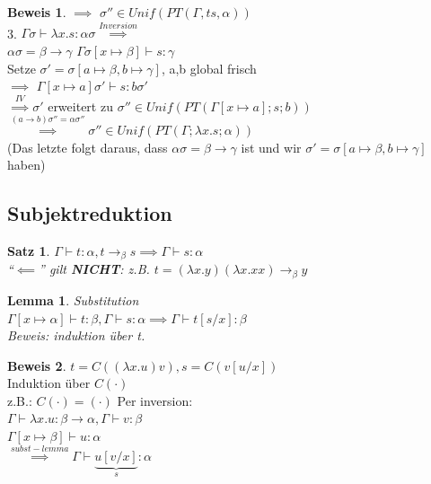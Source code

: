 \documentclass{article}
\newtheorem{satz}{Satz}
\newtheorem{lemma}{Lemma}[section]
\theoremstyle{definition}
\newtheorem{beweis}{Beweis}[section]
\begin{document}
\begin{beweis}
	$\implies$ $\sigma''\in Unif(PT(\Gamma,ts,\alpha))$\\
	3. $\Gamma\sigma\vdash\lambda x.s:\alpha\sigma\stackrel{Inversion}{\implies}$\\
	$\alpha\sigma = \beta\to\gamma$ $\Gamma\sigma[x\mapsto \beta]\vdash s:\gamma$\\
	Setze $\sigma' =\sigma[a\mapsto \beta,b\mapsto \gamma]$, a,b global frisch\\
	$\implies$ $\Gamma[x\mapsto a]\sigma'\vdash s:b\sigma'$\\
	$\stackrel{IV}{\implies}\sigma'$ erweitert zu $\sigma''\in Unif(PT(\Gamma[x\mapsto a];s; b))$\\
	$\stackrel{(a\to b)\sigma'' = \alpha\sigma''}{\implies} \sigma'' \in Unif(PT(\Gamma; \lambda x.s;\alpha))$\\
	(Das letzte folgt daraus, dass $\alpha\sigma= \beta\to \gamma$ ist und wir $\sigma' =\sigma[a\mapsto \beta,b\mapsto \gamma]$ haben)
	\end{beweis}
	\subsection{Subjektreduktion}
	\begin{satz} $\Gamma\vdash t:\alpha, t\to_\beta s\implies \Gamma \vdash s:\alpha$\\
	\danger{} ``$\impliedby$'' gilt \textbf{NICHT}: z.B. $t=(\lambda x.y)(\lambda x.xx)\to_\beta y$
	\end{satz}
	\begin{lemma} Substitution\\
	$\Gamma[x\mapsto \alpha]\vdash t:\beta, \Gamma\vdash s:\alpha\implies \Gamma\vdash t[s/x]:\beta$\\
	Beweis: induktion über t.
	\end{lemma}
	\begin{beweis} $t= C((\lambda x.u)v), s= C(v[u/x])$\\
	Induktion über $C(\cdot)$\\
	z.B.: $C(\cdot) =(\cdot)$ Per inversion:\\
	$\Gamma\vdash \lambda x.u:\beta\to\alpha, \Gamma\vdash v:\beta$\\
	$\Gamma[x\mapsto\beta]\vdash u:\alpha$\\
	$\stackrel{subst-lemma}{\implies} \Gamma\vdash \underbrace{u[v/x]}_{s}:\alpha$
	\end{beweis}
\end{document}
